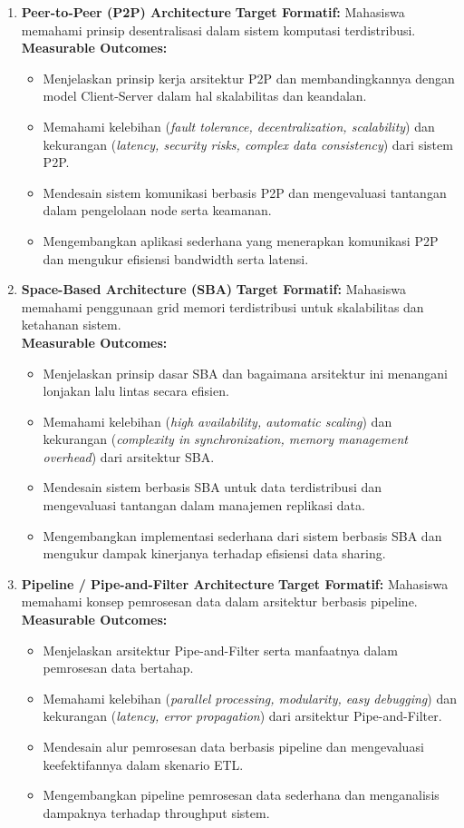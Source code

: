 \begin{enumerate}
\item \textbf{Peer-to-Peer (P2P) Architecture}  
\textbf{Target Formatif:} Mahasiswa memahami prinsip desentralisasi dalam sistem komputasi terdistribusi.  \\
\textbf{Measurable Outcomes:}
\begin{itemize}
\item Menjelaskan prinsip kerja arsitektur P2P dan membandingkannya dengan model Client-Server dalam hal skalabilitas dan keandalan.
\item Memahami kelebihan (\textit{fault tolerance, decentralization, scalability}) dan kekurangan (\textit{latency, security risks, complex data consistency}) dari sistem P2P.
\item Mendesain sistem komunikasi berbasis P2P dan mengevaluasi tantangan dalam pengelolaan node serta keamanan.
\item Mengembangkan aplikasi sederhana yang menerapkan komunikasi P2P dan mengukur efisiensi bandwidth serta latensi.
\end{itemize}

\item \textbf{Space-Based Architecture (SBA)}  
\textbf{Target Formatif:} Mahasiswa memahami penggunaan grid memori terdistribusi untuk skalabilitas dan ketahanan sistem.  \\
\textbf{Measurable Outcomes:}
\begin{itemize}
\item Menjelaskan prinsip dasar SBA dan bagaimana arsitektur ini menangani lonjakan lalu lintas secara efisien.
\item Memahami kelebihan (\textit{high availability, automatic scaling}) dan kekurangan (\textit{complexity in synchronization, memory management overhead}) dari arsitektur SBA.
\item Mendesain sistem berbasis SBA untuk data terdistribusi dan mengevaluasi tantangan dalam manajemen replikasi data.
\item Mengembangkan implementasi sederhana dari sistem berbasis SBA dan mengukur dampak kinerjanya terhadap efisiensi data sharing.
\end{itemize}

\item \textbf{Pipeline / Pipe-and-Filter Architecture}  
\textbf{Target Formatif:} Mahasiswa memahami konsep pemrosesan data dalam arsitektur berbasis pipeline.  \\
\textbf{Measurable Outcomes:}
\begin{itemize}
	\item Menjelaskan arsitektur Pipe-and-Filter serta manfaatnya dalam pemrosesan data bertahap.
	\item Memahami kelebihan (\textit{parallel processing, modularity, easy debugging}) dan kekurangan (\textit{latency, error propagation}) dari arsitektur Pipe-and-Filter.
	\item Mendesain alur pemrosesan data berbasis pipeline dan mengevaluasi keefektifannya dalam skenario ETL.
	\item Mengembangkan pipeline pemrosesan data sederhana dan menganalisis dampaknya terhadap throughput sistem.
\end{itemize}


\end{enumerate}
